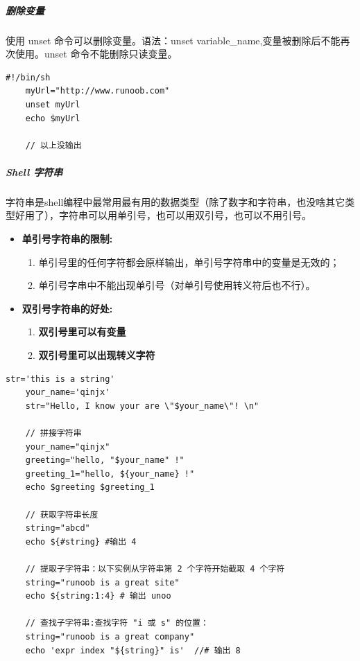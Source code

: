\documentclass[UTF8,a4paper,12pt]{ctexbook}
\begin{document}
				\subparagraph{删除变量}
					使用 unset 命令可以删除变量。语法：unset variable\_name,变量被删除后不能再次使用。unset 命令不能删除只读变量。
					\begin{lstlisting}[frame=L,xleftmargin=.06\textwidth]
	#!/bin/sh
	myUrl="http://www.runoob.com"
	unset myUrl
	echo $myUrl
	
	// 以上没输出
					\end{lstlisting}
					
				\subparagraph{Shell 字符串}
					字符串是shell编程中最常用最有用的数据类型（除了数字和字符串，也没啥其它类型好用了），字符串可以用单引号，也可以用双引号，也可以不用引号。
					\begin{itemize}
						\item \textbf{单引号字符串的限制:}
							\begin{enumerate}
								\item 单引号里的任何字符都会原样输出，单引号字符串中的变量是无效的；
								\item 单引号字串中不能出现单引号（对单引号使用转义符后也不行）。
							\end{enumerate}
						
						\item \textbf{双引号字符串的好处:}
							\begin{enumerate}
								\item \textbf{双引号里可以有变量}
								\item \textbf{双引号里可以出现转义字符}
							\end{enumerate}
					\end{itemize}
					
					\begin{lstlisting}[xleftmargin=.06\textwidth]
	str='this is a string'
	your_name='qinjx'
	str="Hello, I know your are \"$your_name\"! \n"
	
	// 拼接字符串
	your_name="qinjx"
	greeting="hello, "$your_name" !"
	greeting_1="hello, ${your_name} !"
	echo $greeting $greeting_1
	
	// 获取字符串长度 
	string="abcd"
	echo ${#string} #输出 4
	
	// 提取子字符串：以下实例从字符串第 2 个字符开始截取 4 个字符
	string="runoob is a great site"
	echo ${string:1:4} # 输出 unoo
	
	// 查找子字符串:查找字符 "i 或 s" 的位置：
	string="runoob is a great company"
	echo 'expr index "${string}" is'  //# 输出 8
					\end{lstlisting}
					
\end{document}
